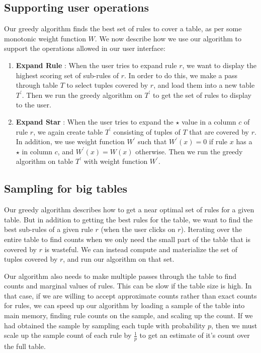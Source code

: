 \documentclass{sig-alternate}
\begin{document}
\subsection{Supporting user operations}
Our greedy algorithm finds the best set of rules to cover a table, as per some monotonic weight function $W$. We now describe how we use our algorithm to support the operations allowed in our user interface:
\begin{enumerate}
\item \textbf{Expand Rule} : When the user tries to expand rule $r$, we want to display the highest scoring set of sub-rules of $r$. In order to do this, we make a pass through table $T$ to select tuples covered by $r$, and load them into a new table $T^{\prime}$. Then we run the greedy algorithm on $T^{\prime}$ to get the set of rules to display to the user.
\item \textbf{Expand Star} : When the user tries to expand the $\star$ value in a column $c$ of rule $r$, we again create table $T^{\prime}$ consisting of tuples of $T$ that are covered by $r$. In addition, we use weight function $W^{\prime}$ such that $W^{\prime}(x) = 0$ if rule $x$ has a $\star$ in column $c$, and $W^{\prime}(x) = W(x)$ otherwise. Then we run the greedy algorithm on table $T^{\prime}$ with weight function $W^{\prime}$.
\end{enumerate}

\subsection{Sampling for big tables}
Our greedy algorithm describes how to get a near optimal set of rules for a given table. But in addition to getting the best rules for the table, we want to find the best sub-rules of a given rule $r$ (when the user clicks on $r$). Iterating over the entire table to find counts when we only need the small part of the table that is covered by $r$ is wasteful. We can instead compute and materialize the set of tuples covered by $r$, and run our algorithm on that set. 

Our algorithm also needs to make multiple passes through the table to find counts and marginal values of rules. This can be slow if the table size is high. In that case, if we are willing to accept approximate counts rather than exact counts for rules, we can speed up our algorithm by loading a sample of the table into main memory, finding rule counts on the sample, and scaling up the count. If we had obtained the sample by sampling each tuple with probability $p$, then we must scale up the sample count of each rule by $\frac{1}{p}$ to get an estimate of it's count over the full table.
\end{document}
